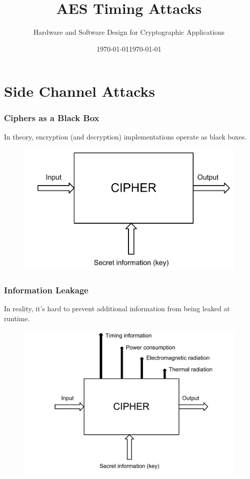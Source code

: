 \documentclass[8pt,handout]{beamer}
\title[AES Timing Attacks]{AES Timing Attacks}
\institute[RIT]{}
\date{\today}
\author{Hardware and Software Design for Cryptographic Applications}
\date{\today}
\begin{document}

\begin{frame}
	\titlepage
\end{frame}

\section{Side Channel Attacks}
\begin{frame}
	\frametitle{Ciphers as a Black Box}
In theory, encryption (and decryption) implementations operate as black boxes.
\begin{figure}
\centering
\includegraphics[scale = 0.5]{images/blackbox.pdf}
\end{figure}

\end{frame}

\begin{frame}
	\frametitle{Information Leakage}
In reality, it's hard to prevent additional information from being leaked at runtime.
\begin{figure}
\centering
\includegraphics[scale = 0.5]{images/leaked.pdf}
\end{figure}
	
\end{frame}
\end{document}
